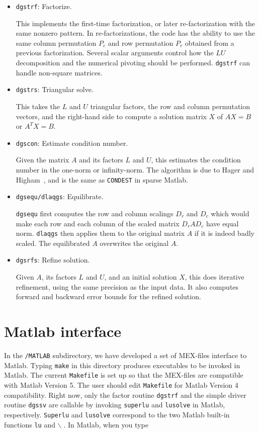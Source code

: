 \begin{itemize}
\item {\tt dgstrf}: Factorize.

      This implements the first-time factorization, or later re-factorization
      with the same nonzero pattern. In re-factorizations, the code
      has the ability to use the same column permutation $P_c$ and
      row permutation $P_r$ obtained from a previous factorization.
      Several scalar arguments control how the $LU$ decomposition and the 
      numerical pivoting should be performed. {\tt dgstrf} can handle
      non-square matrices.

\item {\tt dgstrs}: Triangular solve.

      This takes the $L$ and $U$ triangular factors, the row and column 
      permutation vectors, and the right-hand side to compute a solution
      matrix $X$ of $AX=B$ or $A^TX=B$.

\item {\tt dgscon}: Estimate condition number.
      
      Given the matrix $A$ and its factors $L$ and $U$, this estimates the 
      condition number in the one-norm or infinity-norm. The algorithm is 
      due to Hager and Higham~\cite{higham89}, and is the same as 
      {\tt CONDEST} in sparse Matlab.

\item {\tt dgsequ/dlaqgs}: Equilibrate.

      {\tt dgsequ} first computes the row and column scalings $D_r$ 
      and $D_c$ which would make each row and each column of the scaled 
      matrix $D_rAD_c$ have equal norm. 
      {\tt dlaqgs} then applies them to the original matrix $A$ if it is 
      indeed badly scaled. The equilibrated $A$ overwrites the original $A$.

\item {\tt dgsrfs}: Refine solution.

      Given $A$, its factors $L$ and $U$, and an initial solution $X$, 
      this does iterative refinement, using the same precision as the 
      input data. It also computes
      forward and backward error bounds for the refined solution.

\end{itemize}


\section{Matlab interface}
\label{sec:MatlabInterface}
In the {\tt \SuperLU/MATLAB} subdirectory, we have developed a set of 
MEX-files interface to Matlab. Typing {\tt make} in this directory
produces executables to be invoked in Matlab.
The current {\tt Makefile} is set up so that the MEX-files
are compatible with Matlab Version 5. The user should edit
{\tt Makefile} for Matlab Version 4 compatibility.
Right now, only the factor routine {\tt dgstrf} 
and the simple driver routine {\tt dgssv} are callable by invoking
{\tt superlu} and {\tt lusolve} in Matlab, respectively. {\tt Superlu} 
and {\tt lusolve} correspond to the two Matlab built-in functions {\tt lu}
and {\tt $\backslash$}$\;$. In Matlab, when you type 

